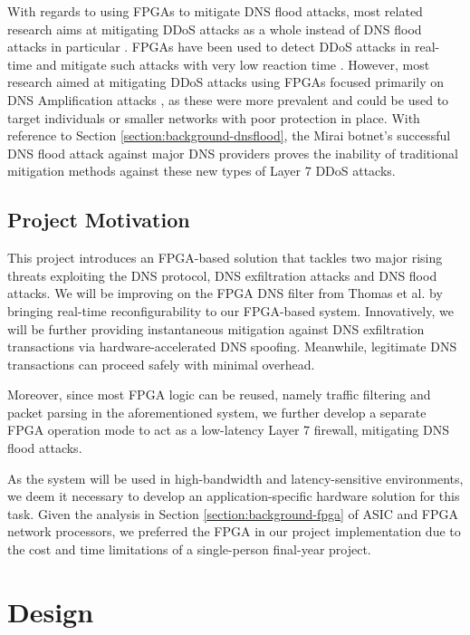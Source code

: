 \documentclass[a4paper]{report}
\begin{document}
With regards to using FPGAs to mitigate DNS flood attacks, most related research aims at mitigating DDoS attacks as a whole instead of DNS flood attacks in particular \cite{hoque-2017, nagy-2018, tokusashi-2016, thinh-2016}. FPGAs have been used to detect DDoS attacks in real-time \cite{hoque-2017} and mitigate such attacks with very low reaction time \cite{nagy-2018}. However, most research aimed at mitigating DDoS attacks using FPGAs focused primarily on DNS Amplification attacks \cite{nagy-2018, thinh-2016, tokusashi-2016}, as these were more prevalent and could be used to target individuals or smaller networks with poor protection in place. With reference to Section \ref{section:background-dnsflood}, the Mirai botnet's successful DNS flood attack against major DNS providers proves the inability of traditional mitigation methods against these new types of Layer 7 DDoS attacks. 

\section{Project Motivation}

This project introduces an FPGA-based solution that tackles two major rising threats exploiting the DNS protocol, DNS exfiltration attacks and DNS flood attacks. We will be improving on the FPGA DNS filter from Thomas et al. \cite{thomas-2011} by bringing real-time reconfigurability to our FPGA-based system. Innovatively, we will be further providing instantaneous	mitigation against DNS exfiltration transactions via hardware-accelerated DNS spoofing. Meanwhile, legitimate DNS transactions can proceed safely with minimal overhead.

Moreover, since most FPGA logic can be reused, namely traffic filtering and packet parsing in the aforementioned system, we further develop a separate FPGA operation mode to act as a low-latency Layer 7 firewall, mitigating DNS flood attacks.

As the system will be used in high-bandwidth and latency-sensitive environments, we deem it necessary to develop an application-specific hardware solution for this task. Given the analysis in Section \ref{section:background-fpga} of ASIC and FPGA network processors, we preferred the FPGA in our project implementation due to the cost and time limitations of a single-person final-year project.


\chapter{Design}
\end{document}
